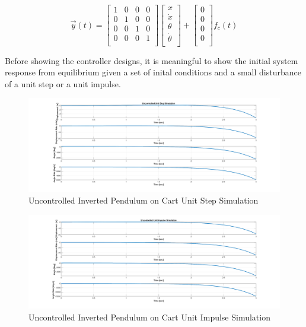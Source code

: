 \documentclass[titlepage]{article}
\begin{document}
\begin{equation}
\vec{y}\left(t\right) = \begin{bmatrix}
1 & 0  & 0 & 0\\
0 & 1  & 0 & 0\\
0 & 0  & 1 & 0\\
0 & 0  & 0 & 1\\
\end{bmatrix} \begin{bmatrix}
x\\
\dot{x}\\
\theta\\
\dot{\theta}\\
\end{bmatrix} + \begin{bmatrix}
0\\
0\\
0\\
0\\
\end{bmatrix} f_{c}\left(t\right)
\end{equation}

Before showing the controller designs, it is meaningful to show the initial system response from equilibrium given a set of inital conditions and a small disturbance of a unit step or a unit impulse.

\begin{figure}[H]
\center
\includegraphics[width=1\linewidth]{uncontrolled_unit_step.png}
\caption{Uncontrolled Inverted Pendulum on Cart Unit Step Simulation}
\end{figure}

\begin{figure}[H]
\center
\includegraphics[width=1\linewidth]{uncontrolled_unit_impulse.png}
\caption{Uncontrolled Inverted Pendulum on Cart Unit Impulse Simulation}
\end{figure}
\end{document}
